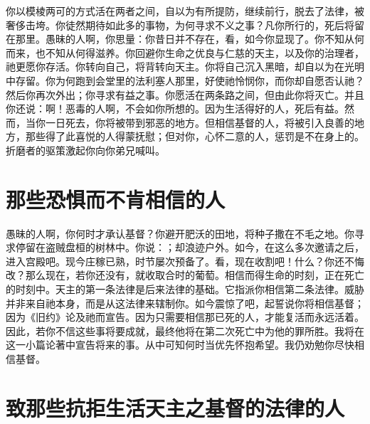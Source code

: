 你以模棱两可的方式活在两者之间，自以为有所提防，继续前行，脱去了法律，被奢侈击垮。你徒然期待如此多的事物，为何寻求不义之事？凡你所行的，死后将留在那里。愚昧的人啊，你思量：你昔日并不存在，看，如今你显现了。你不知从何而来，也不知从何得滋养。你回避你生命之优良与仁慈的天主，以及你的治理者，祂更愿你存活。你转向自己，将背转向天主。你将自己沉入黑暗，却自以为在光明中存留。你为何跑到会堂里的法利塞人那里，好使祂怜悯你，而你却自愿否认祂？然后你再次外出；你寻求有益之事。你愿活在两条路之间，但由此你将灭亡。并且你还说：啊！恶毒的人啊，不会如你所想的。因为生活得好的人，死后有益。然而，当你一日死去，你将被带到邪恶的地方。但相信基督的人，将被引入良善的地方，那些得了此喜悦的人得蒙抚慰；但对你，心怀二意的人，惩罚是不在身上的。折磨者的驱策激起你向你弟兄喊叫。\par


\section{那些恐惧而不肯相信的人}

愚昧的人啊，你何时才承认基督？你避开肥沃的田地，将种子撒在不毛之地。你寻求停留在盗贼盘桓的树林中。你说：；却浪迹户外。如今，在这么多次邀请之后，进入宫殿吧。现今庄稼已熟，时节屡次预备了。看，现在收割吧！什么？你还不悔改？那么现在，若你还没有，就收取合时的葡萄。相信而得生命的时刻，正在死亡的时刻中。天主的第一条法律是后来法律的基础。它指派你相信第二条法律。威胁并非来自祂本身，而是从这法律来辖制你。如今震惊了吧，起誓说你将相信基督；因为《旧约》论及祂而宣告。因为只需要相信那已死的人，才能复活而永远活着。因此，若你不信这些事将要成就，最终他将在第二次死亡中为他的罪所胜。我将在这一小篇论著中宣告将来的事。从中可知何时当优先怀抱希望。我仍劝勉你尽快相信基督。\par


\section{致那些抗拒生活天主之基督的法律的人}

